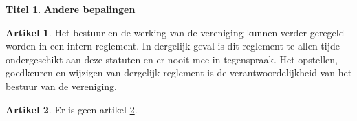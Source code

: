 \documentclass[a4paper,10pt]{article}
\theoremstyle{definition}
\newtheorem{titel}{\newline\Large Titel}
\newtheorem{artikel}{\large Artikel}
\newenvironment{artikelbis}
  {\addtocounter{artikel}{-1}
   \renewcommand{\theartikel}{\arabic{artikel}.bis}
   \begin{artikel}}
  {\end{artikel}}
\newcommand{\ttext}[1]{\Large \textbf{#1} \normalsize}
\newcommand{\ttextcr}{\hfill\newline}
\begin{document}

\begin{titel}\ttext{Andere bepalingen}

  \begin{artikel}\label{varia-reglement}\ttextcr
    Het bestuur en de werking van de vereniging kunnen verder geregeld worden in een intern reglement.
    In dergelijk geval is dit reglement te allen tijde ondergeschikt aan deze statuten en er nooit mee in tegenspraak.
    Het opstellen, goedkeuren en wijzigen van dergelijk reglement is de verantwoordelijkheid van het bestuur van de vereniging.
  \end{artikel}

  \begin{artikelbis}\label{varia-bis}\ttextcr
    Er is geen artikel \ref{varia-bis}.
  \end{artikelbis}

\end{titel}
\end{document}
